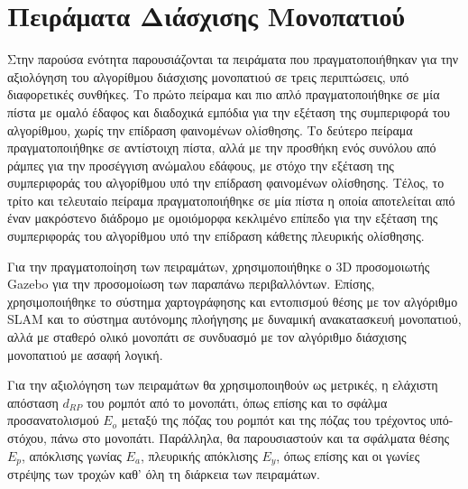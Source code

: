 \section{Πειράματα Διάσχισης Μονοπατιού} \label{sec:path_tracking_experiments}
Στην παρούσα ενότητα παρουσιάζονται τα πειράματα που πραγματοποιήθηκαν για την αξιολόγηση του αλγορίθμου διάσχισης μονοπατιού σε τρεις περιπτώσεις, υπό διαφορετικές συνθήκες. Το πρώτο πείραμα και πιο απλό πραγματοποιήθηκε σε μία πίστα με ομαλό έδαφος και διαδοχικά εμπόδια για την εξέταση της συμπεριφορά του αλγορίθμου, χωρίς την επίδραση φαινομένων ολίσθησης. Το δεύτερο πείραμα πραγματοποιήθηκε σε αντίστοιχη πίστα, αλλά με την προσθήκη ενός συνόλου από ράμπες για την προσέγγιση ανώμαλου εδάφους, με στόχο την εξέταση της συμπεριφοράς του αλγορίθμου υπό την επίδραση φαινομένων ολίσθησης. Τέλος, το τρίτο και τελευταίο πείραμα πραγματοποιήθηκε σε μία πίστα η οποία αποτελείται από έναν μακρόστενο διάδρομο με ομοιόμορφα κεκλιμένο επίπεδο για την εξέταση της συμπεριφοράς του αλγορίθμου υπό την επίδραση κάθετης πλευρικής ολίσθησης.

\bigskip
Για την πραγματοποίηση των πειραμάτων, χρησιμοποιήθηκε ο 3D προσομοιωτής Gazebo για την προσομοίωση των παραπάνω περιβαλλόντων. Επίσης, χρησιμοποιήθηκε το σύστημα χαρτογράφησης και εντοπισμού θέσης με τον αλγόριθμο SLAM και το σύστημα αυτόνομης πλοήγησης με δυναμική ανακατασκευή μονοπατιού, αλλά με σταθερό ολικό μονοπάτι σε συνδυασμό με τον αλγόριθμο διάσχισης μονοπατιού με ασαφή λογική.

\bigskip
Για την αξιολόγηση των πειραμάτων θα χρησιμοποιηθούν ως μετρικές, η ελάχιστη απόσταση $d_{RP}$ του ρομπότ από το μονοπάτι, όπως επίσης και το σφάλμα προσανατολισμού $E_o$ μεταξύ της πόζας του ρομπότ και της πόζας του τρέχοντος υπό-στόχου, πάνω στο μονοπάτι. Παράλληλα, θα παρουσιαστούν και τα σφάλματα θέσης $E_p$, απόκλισης γωνίας $E_a$, πλευρικής απόκλισης $E_y$, όπως επίσης και οι γωνίες στρέψης των τροχών καθ' όλη τη διάρκεια των πειραμάτων.

